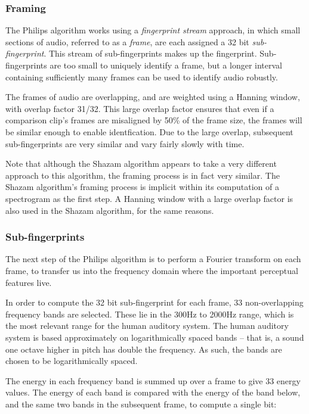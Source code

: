\documentclass[12pt,a4paper,twoside,openright]{report}
\begin{document}
\subsubsection{Framing}

The Philips algorithm works using a \textit{fingerprint stream} approach, in which small sections of audio, referred to as a \textit{frame}, are each assigned a 32 bit \textit{sub-fingerprint}. This stream of sub-fingerprints makes up the fingerprint. Sub-fingerprints are too small to uniquely identify a frame, but a longer interval containing sufficiently many frames can be used to identify audio robustly.

The frames of audio are overlapping, and are weighted using a Hanning window, with overlap factor 31/32. This large overlap factor ensures that even if a comparison clip's frames are misaligned by 50\% of the frame size, the frames will be similar enough to enable identfication. Due to the large overlap, subsequent sub-fingerprints are very similar and vary fairly slowly with time. 

Note that although the Shazam algorithm appears to take a very different approach to this algorithm, the framing process is in fact very similar. The Shazam algorithm's framing process is implicit within its computation of a spectrogram as the first step. A Hanning window with a large overlap factor is also used in the Shazam algorithm, for the same reasons.

\subsubsection{Sub-fingerprints}

The next step of the Philips algorithm is to perform a Fourier transform on each frame, to transfer us into the frequency domain where the important perceptual features live.

In order to compute the 32 bit sub-fingerprint for each frame, 33 non-overlapping frequency bands are selected. These lie in the 300Hz to 2000Hz range, which is the most relevant range for the human auditory system. The human auditory system is based approximately on logarithmically spaced bands -- that is, a sound one octave higher in pitch has double the frequency. As such, the bands are chosen to be logarithmically spaced.

The energy in each frequency band is summed up over a frame to give 33 energy values. The energy of each band is compared with the energy of the band below, and the same two bands in the subsequent frame, to compute a single bit:
\end{document}

